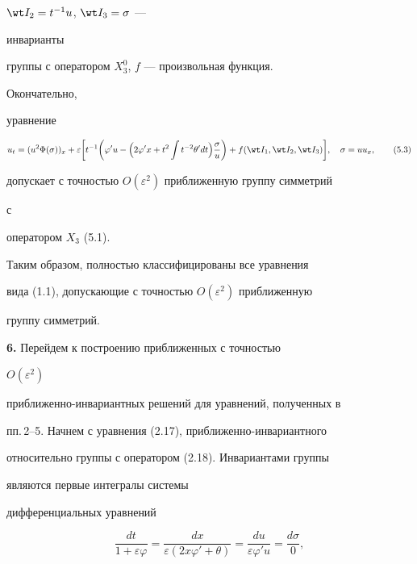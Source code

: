 $\wt I_2=t^{-1}u$, $\wt I_3=\sigma$ --- 


инварианты 


группы с оператором $X^0_3$, $f$ --- произвольная функция. 


Окончательно, 


уравнение 


\begin{equation} 


u_t=(u^2\Phi(\sigma))_x+\varepsilon\bigg[t^{-1} 


\bigg(\varphi'u-\Big(2\varphi'x+t^2\int t^{-2}\theta'dt 


\Big)\frac{\sigma}{u}\bigg)+f(\wt I_1,\wt I_2,\wt I_3)\bigg],\quad 


\sigma=u u_x, \tag{5.3} 


\end{equation} 


допускает с точностью $O(\varepsilon^2)$ приближенную группу симметрий 


с 


оператором $X_3$ (5.1). 


 


Таким образом, полностью классифицированы все уравнения 


вида (1.1), допускающие с точностью $O(\varepsilon^2)$ приближенную 


группу симметрий. 


\medskip 


 


{\bf 6.} Перейдем к построению приближенных с точностью 


$O(\varepsilon^2)$ 


приближенно-инвариантных решений для уравнений, полученных в 


пп.\,2--5. Начнем с уравнения (2.17), приближенно-инвариантного 


относительно группы с оператором (2.18). Инвариантами группы 


являются первые интегралы системы 


дифференциальных уравнений 


$$ 


\frac{dt}{1+\varepsilon\varphi}= 


\frac{dx}{\varepsilon(2x\varphi'+\theta)}= 


\frac{du}{\varepsilon\varphi'u}=\frac{d\sigma}{0},


$$ 


